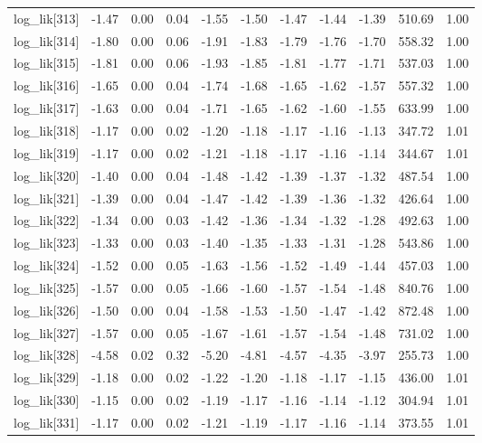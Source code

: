 \begin{table}[ht]
\begin{tabular}{rrrrrrrrrrr}
  log\_lik[313] & -1.47 & 0.00 & 0.04 & -1.55 & -1.50 & -1.47 & -1.44 & -1.39 & 510.69 & 1.00 \\ 
  log\_lik[314] & -1.80 & 0.00 & 0.06 & -1.91 & -1.83 & -1.79 & -1.76 & -1.70 & 558.32 & 1.00 \\ 
  log\_lik[315] & -1.81 & 0.00 & 0.06 & -1.93 & -1.85 & -1.81 & -1.77 & -1.71 & 537.03 & 1.00 \\ 
  log\_lik[316] & -1.65 & 0.00 & 0.04 & -1.74 & -1.68 & -1.65 & -1.62 & -1.57 & 557.32 & 1.00 \\ 
  log\_lik[317] & -1.63 & 0.00 & 0.04 & -1.71 & -1.65 & -1.62 & -1.60 & -1.55 & 633.99 & 1.00 \\ 
  log\_lik[318] & -1.17 & 0.00 & 0.02 & -1.20 & -1.18 & -1.17 & -1.16 & -1.13 & 347.72 & 1.01 \\ 
  log\_lik[319] & -1.17 & 0.00 & 0.02 & -1.21 & -1.18 & -1.17 & -1.16 & -1.14 & 344.67 & 1.01 \\ 
  log\_lik[320] & -1.40 & 0.00 & 0.04 & -1.48 & -1.42 & -1.39 & -1.37 & -1.32 & 487.54 & 1.00 \\ 
  log\_lik[321] & -1.39 & 0.00 & 0.04 & -1.47 & -1.42 & -1.39 & -1.36 & -1.32 & 426.64 & 1.00 \\ 
  log\_lik[322] & -1.34 & 0.00 & 0.03 & -1.42 & -1.36 & -1.34 & -1.32 & -1.28 & 492.63 & 1.00 \\ 
  log\_lik[323] & -1.33 & 0.00 & 0.03 & -1.40 & -1.35 & -1.33 & -1.31 & -1.28 & 543.86 & 1.00 \\ 
  log\_lik[324] & -1.52 & 0.00 & 0.05 & -1.63 & -1.56 & -1.52 & -1.49 & -1.44 & 457.03 & 1.00 \\ 
  log\_lik[325] & -1.57 & 0.00 & 0.05 & -1.66 & -1.60 & -1.57 & -1.54 & -1.48 & 840.76 & 1.00 \\ 
  log\_lik[326] & -1.50 & 0.00 & 0.04 & -1.58 & -1.53 & -1.50 & -1.47 & -1.42 & 872.48 & 1.00 \\ 
  log\_lik[327] & -1.57 & 0.00 & 0.05 & -1.67 & -1.61 & -1.57 & -1.54 & -1.48 & 731.02 & 1.00 \\ 
  log\_lik[328] & -4.58 & 0.02 & 0.32 & -5.20 & -4.81 & -4.57 & -4.35 & -3.97 & 255.73 & 1.00 \\ 
  log\_lik[329] & -1.18 & 0.00 & 0.02 & -1.22 & -1.20 & -1.18 & -1.17 & -1.15 & 436.00 & 1.01 \\ 
  log\_lik[330] & -1.15 & 0.00 & 0.02 & -1.19 & -1.17 & -1.16 & -1.14 & -1.12 & 304.94 & 1.01 \\ 
  log\_lik[331] & -1.17 & 0.00 & 0.02 & -1.21 & -1.19 & -1.17 & -1.16 & -1.14 & 373.55 & 1.01 \\ 

\end{tabular}
\end{table}
